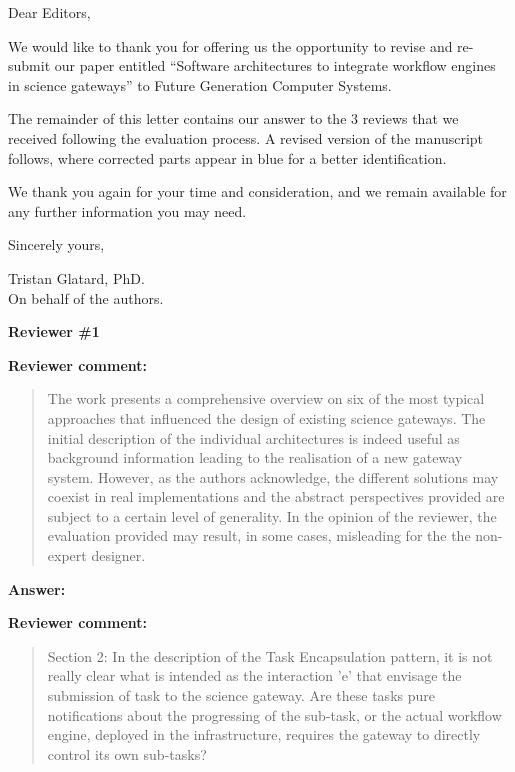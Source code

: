 \documentclass[a4]{letter}
\date{October 16th, 2016}
\newenvironment{review}%
{\textbf{Reviewer comment:}\begin{quote}}%
{\end{quote}}%
\newcommand{\answer}[1]{\textbf{Answer:} #1}
\begin{document}
\begin{letter}{}

\opening{Dear Editors,}

We would like to thank you for offering us the opportunity to revise
and re-submit our paper entitled ``Software architectures to integrate
workflow engines in science gateways'' to Future Generation Computer
Systems.

The remainder of this letter contains our answer to the 3 reviews that
we received following the evaluation process. A revised version of the
manuscript follows, where corrected parts appear in blue for a better
identification. 

We thank you again for your time and consideration, and we remain available for any further information you may need.

\vspace{0.5cm}

Sincerely yours,

\vspace{1cm}

\closing{Tristan Glatard, PhD.\\On behalf of the authors.}

\newpage

\textbf{Reviewer \#1}

\begin{review}
  The work presents a comprehensive overview on six of the most
  typical approaches that influenced the design of existing science
  gateways. The initial description of the individual architectures is
  indeed useful as background information leading to the realisation
  of a new gateway system. However, as the authors acknowledge, the
  different solutions may coexist in real implementations and the
  abstract perspectives provided are subject to a certain level of
  generality. In the opinion of the reviewer, the evaluation provided
  may result, in some cases, misleading for the the non-expert
  designer.
\end{review}

\answer{}

\begin{review}
  Section 2: In the description of the Task Encapsulation pattern, it
  is not really clear what is intended as the interaction 'e' that
  envisage the submission of task to the science gateway. Are these
  tasks pure notifications about the progressing of the sub-task, or
  the actual workflow engine, deployed in the infrastructure, requires
  the gateway to directly control its own sub-tasks?
\end{review}


\end{letter}
\end{document}
